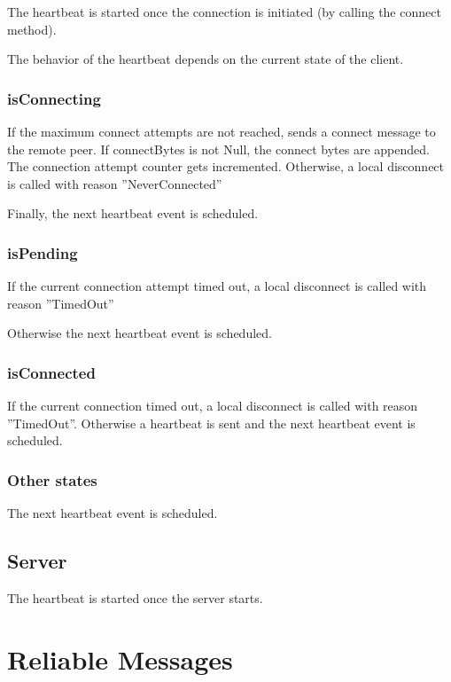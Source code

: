 The heartbeat is started once the connection is initiated (by calling the connect method).

The behavior of the heartbeat depends on the current state of the client.

\subsubsection{isConnecting}

If the maximum connect attempts are not reached, sends a connect message to the remote peer. If connectBytes is not Null, the connect bytes are appended. The connection attempt counter gets incremented. Otherwise, a local disconnect is called with reason ''NeverConnected''

Finally, the next heartbeat event is scheduled.

\subsubsection{isPending}

If the current connection attempt timed out, a local disconnect is called with reason ''TimedOut''

Otherwise the next heartbeat event is scheduled.

\subsubsection{isConnected}

If the current connection timed out, a local disconnect is called with reason ''TimedOut''.
Otherwise a heartbeat is sent and the next heartbeat event is scheduled.

\subsubsection{Other states}

The next heartbeat event is scheduled.

\subsection{Server}

The heartbeat is started once the server starts.

\section{Reliable Messages}

